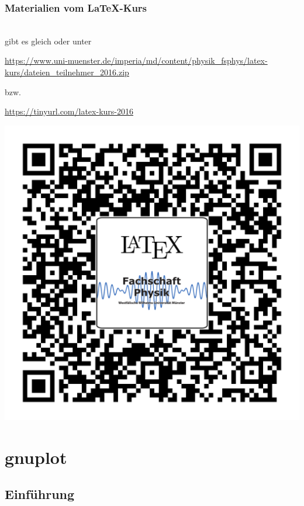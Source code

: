 \begin{frame}[<+->]
	\vfuzz=6pt
	\frametitle{Materialien vom \LaTeX-Kurs}
	
	\centering
	\large
	\\
	gibt es gleich oder unter
	
	\url{https://www.uni-muenster.de/imperia/md/content/physik_fsphys/latex-kurs/dateien_teilnehmer_2016.zip}
	
	bzw.\
	
	\url{https://tinyurl.com/latex-kurs-2016}
	
	\vspace{-1ex}
	\includegraphics[height=0.6\textheight]{res/qrcode_dateien.pdf}
\end{frame}

\section{gnuplot}
\subsection{Einführung}

